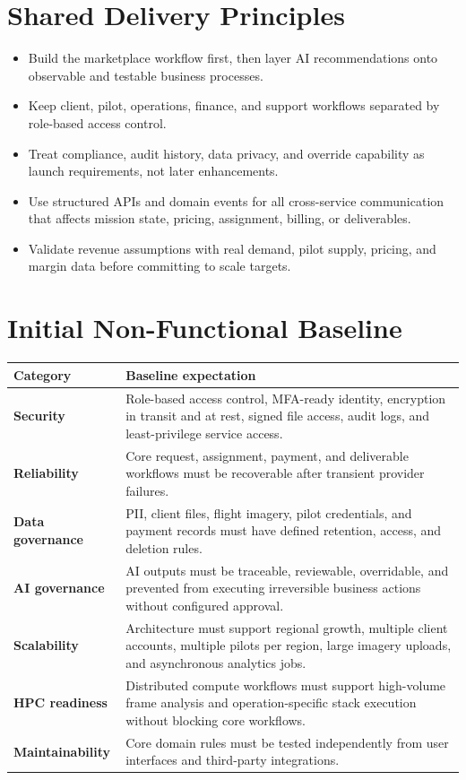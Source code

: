 \documentclass[11pt,a4paper]{article}
\begin{document}
\section{Shared Delivery Principles}

\begin{itemize}[leftmargin=*]
    \item Build the marketplace workflow first, then layer AI recommendations onto observable and testable business processes.
    \item Keep client, pilot, operations, finance, and support workflows separated by role-based access control.
    \item Treat compliance, audit history, data privacy, and override capability as launch requirements, not later enhancements.
    \item Use structured APIs and domain events for all cross-service communication that affects mission state, pricing, assignment, billing, or deliverables.
    \item Validate revenue assumptions with real demand, pilot supply, pricing, and margin data before committing to scale targets.
\end{itemize}

\section{Initial Non-Functional Baseline}

\begin{longtable}{>{\bfseries}p{}p{}}
\toprule
Category & Baseline expectation \\
\midrule
Security & Role-based access control, MFA-ready identity, encryption in transit and at rest, signed file access, audit logs, and least-privilege service access. \\
Reliability & Core request, assignment, payment, and deliverable workflows must be recoverable after transient provider failures. \\
Data governance & PII, client files, flight imagery, pilot credentials, and payment records must have defined retention, access, and deletion rules. \\
AI governance & AI outputs must be traceable, reviewable, overridable, and prevented from executing irreversible business actions without configured approval. \\
Scalability & Architecture must support regional growth, multiple client accounts, multiple pilots per region, large imagery uploads, and asynchronous analytics jobs. \\
HPC readiness & Distributed compute workflows must support high-volume frame analysis and operation-specific stack execution without blocking core workflows. \\
Maintainability & Core domain rules must be tested independently from user interfaces and third-party integrations. \\
\bottomrule
\end{longtable}
\end{document}
